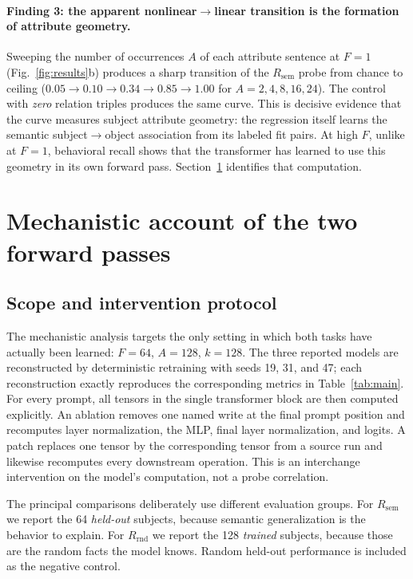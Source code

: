 \documentclass[11pt]{article}
\newcommand{\Rsem}{R_{\mathrm{sem}}}
\newcommand{\Rrnd}{R_{\mathrm{rnd}}}
\begin{document}
\paragraph{Finding 3: the apparent nonlinear$\rightarrow$linear transition is the formation of attribute geometry.}
Sweeping the number of occurrences $A$ of each attribute sentence at $F{=}1$ (Fig.~\ref{fig:results}b) produces a sharp transition of the $\Rsem$ probe from chance to ceiling ($0.05 \rightarrow 0.10 \rightarrow 0.34 \rightarrow 0.85 \rightarrow 1.00$ for $A = 2,4,8,16,24$). The control with \emph{zero} relation triples produces the same curve. This is decisive evidence that the curve measures subject attribute geometry: the regression itself learns the semantic subject$\to$object association from its labeled fit pairs. At high $F$, unlike at $F{=}1$, behavioral recall shows that the transformer has learned to use this geometry in its own forward pass. Section~\ref{sec:mechanism} identifies that computation.

\section{Mechanistic account of the two forward passes}
\label{sec:mechanism}

\subsection{Scope and intervention protocol}

The mechanistic analysis targets the only setting in which both tasks have actually been learned: $F{=}64$, $A{=}128$, $k{=}128$. The three reported models are reconstructed by deterministic retraining with seeds 19, 31, and 47; each reconstruction exactly reproduces the corresponding metrics in Table~\ref{tab:main}. For every prompt, all tensors in the single transformer block are then computed explicitly. An ablation removes one named write at the final prompt position and recomputes layer normalization, the MLP, final layer normalization, and logits. A patch replaces one tensor by the corresponding tensor from a source run and likewise recomputes every downstream operation. This is an interchange intervention on the model's computation, not a probe correlation.

The principal comparisons deliberately use different evaluation groups. For $\Rsem$ we report the 64 \emph{held-out} subjects, because semantic generalization is the behavior to explain. For $\Rrnd$ we report the 128 \emph{trained} subjects, because those are the random facts the model knows. Random held-out performance is included as the negative control.
\end{document}
